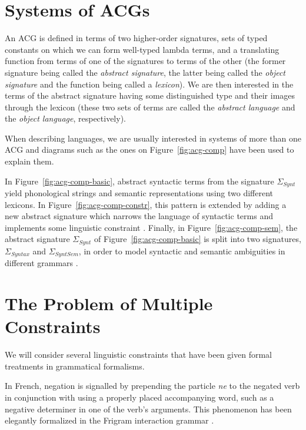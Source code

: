 \documentclass[twocolumn]{article}
\begin{document}
\section{Systems of ACGs}
\label{sec:acg-comp}

An ACG is defined in terms of two higher-order signatures, sets of typed
constants on which we can form well-typed lambda terms, and a
translating function from terms of one of the signatures to terms of the
other (the former signature being called the \emph{abstract signature},
the latter being called the \emph{object signature} and the function
being called a \emph{lexicon}). We are then interested in the terms of
the abstract signature having some distinguished type and their images
through the lexicon (these two sets of terms are called the
\emph{abstract language} and the \emph{object language}, respectively).

When describing languages, we are usually interested in systems of more
than one ACG and diagrams such as the ones on Figure~\ref{fig:acg-comp}
have been used to explain them.

In Figure~\ref{fig:acg-comp-basic}, abstract syntactic terms from the
signature $\Sigma_{Synt}$ yield phonological strings and semantic
representations using two different lexicons. In
Figure~\ref{fig:acg-comp-constr}, this pattern is extended by adding a
new abstract signature which narrows the language of syntactic terms and
implements some linguistic constraint
\cite{pogodalla2012controlling}. Finally, in
Figure~\ref{fig:acg-comp-sem}, the abstract signature $\Sigma_{Synt}$ of
Figure~\ref{fig:acg-comp-basic} is split into two signatures,
$\Sigma_{Syntax}$ and $\Sigma_{SyntSem}$, in order to model syntactic
and semantic ambiguities in different grammars
\cite{pogodalla2007generalizing}.


\section{The Problem of Multiple Constraints}
\label{sec:constraints}

We will consider several linguistic constraints that have been given
formal treatments in grammatical formalisms.

In French, negation is signalled by prepending the particle \emph{ne} to
the negated verb in conjunction with using a properly placed
accompanying word, such as a negative determiner in one of the verb's
arguments. This phenomenon has been elegantly formalized in the Frigram
interaction grammar \cite{perrier2007french}.
\end{document}
